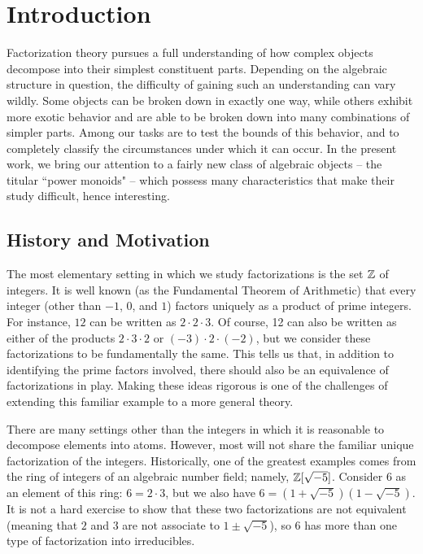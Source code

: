 \chapter{Introduction}
Factorization theory pursues a full understanding of how complex objects decompose into their simplest constituent parts.  
Depending on the algebraic structure in question, the difficulty of gaining such an understanding can vary wildly. 
Some objects can be broken down in exactly one way, while others exhibit more exotic behavior and are able to be broken down into many combinations of simpler parts.
Among our tasks are to test the bounds of this behavior, and to completely classify the circumstances under which it can occur.
In the present work, we bring our attention to a fairly new class of algebraic objects -- the titular ``power monoids" --  which possess many characteristics that make their study difficult, hence interesting.

\section{History and Motivation}

The most elementary setting in which we study factorizations is the set $\mathbb{Z}$ of integers.
It is well known (as the Fundamental Theorem of Arithmetic) that every integer (other than $-1$, $0$, and $1$) factors uniquely as a product of prime integers.
For instance, $12$ can be written as $2\cdot 2\cdot 3$.
Of course, 12 can also be written as either of the products $2\cdot 3\cdot 2$ or $(-3)\cdot 2\cdot (-2)$, but we consider these factorizations to be fundamentally the same.  
This tells us that, in addition to identifying the prime factors involved, there should also be an equivalence of factorizations in play.
Making these ideas rigorous is one of the challenges of extending this familiar example to a more general theory.


There are many settings other than the integers in which it is reasonable to decompose elements into atoms. 
However, most will not share the familiar unique factorization of the integers.  
Historically, one of the greatest examples comes from the ring of integers of an algebraic number field; namely, $\mathbb{Z}[\sqrt{-5}]$.
Consider $6$ as an element of this ring: $6=2\cdot3$, but we also have $6 = (1+\sqrt{-5})(1-\sqrt{-5})$.
It is not a hard exercise to show that these two factorizations are not equivalent (meaning that $2$ and $3$ are not associate to $1\pm\sqrt{-5}$), so $6$ has more than one type of factorization into irreducibles.

